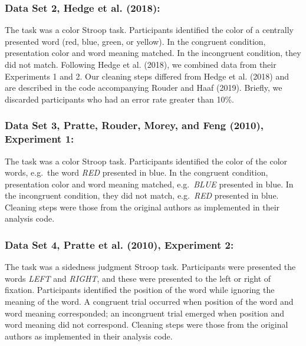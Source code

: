 \documentclass[
  ,man]{apa6}
\begin{document}
\hypertarget{data-set-2-hedge.etal.2018}{%
\subsubsection{Data Set 2, Hedge et al. (2018):}\label{data-set-2-hedge.etal.2018}}

The task was a color Stroop task. Participants identified the color of a centrally presented word (red, blue, green, or yellow). In the congruent condition, presentation color and word meaning matched. In the incongruent condition, they did not match. Following Hedge et al. (2018), we combined data from their Experiments 1 and 2. Our cleaning steps differed from Hedge et al. (2018) and are described in the code accompanying Rouder and Haaf (2019). Briefly, we discarded participants who had an error rate greater than 10\%.

\hypertarget{data-set-3-pratte.etal.2010-experiment-1}{%
\subsubsection{Data Set 3, Pratte, Rouder, Morey, and Feng (2010), Experiment 1:}\label{data-set-3-pratte.etal.2010-experiment-1}}

The task was a color Stroop task. Participants identified the color of the color words, e.g.~the word \emph{RED} presented in blue. In the congruent condition, presentation color and word meaning matched, e.g.~\emph{BLUE} presented in blue. In the incongruent condition, they did not match, e.g.~\emph{RED} presented in blue. Cleaning steps were those from the original authors as implemented in their analysis code.

\hypertarget{data-set-4-pratte.etal.2010-experiment-2}{%
\subsubsection{Data Set 4, Pratte et al. (2010), Experiment 2:}\label{data-set-4-pratte.etal.2010-experiment-2}}

The task was a sidedness judgment Stroop task. Participants were presented the words \emph{LEFT} and \emph{RIGHT}, and these were presented to the left or right of fixation. Participants identified the position of the word while ignoring the meaning of the word. A congruent trial occurred when position of the word and word meaning corresponded; an incongruent trial emerged when position and word meaning did not correspond. Cleaning steps were those from the original authors as implemented in their analysis code.
\end{document}
